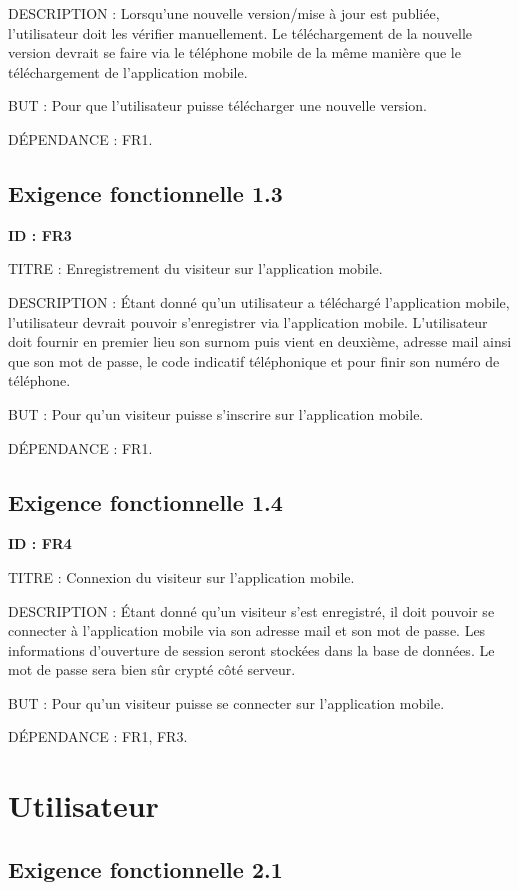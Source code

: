 \documentclass[titlepage, 12pt]{report}
\begin{document}
DESCRIPTION : Lorsqu'une nouvelle version/mise à jour est publiée, l'utilisateur doit les vérifier manuellement. Le téléchargement de la nouvelle version devrait se faire via le téléphone mobile de la même manière que le téléchargement de l'application mobile.

BUT : Pour que l'utilisateur puisse télécharger une nouvelle version.

DÉPENDANCE : FR1.

\subsection{Exigence fonctionnelle 1.3}

\textbf{ID : FR3}

TITRE : Enregistrement du visiteur sur l'application mobile.

DESCRIPTION : Étant donné qu'un utilisateur a téléchargé l'application mobile, l'utilisateur devrait pouvoir s'enregistrer via l'application mobile. L'utilisateur doit fournir en premier lieu son surnom puis vient en deuxième, adresse mail ainsi que son mot de passe, le code indicatif téléphonique et pour finir son numéro de téléphone.

BUT : Pour qu'un visiteur puisse s'inscrire sur l'application mobile.

DÉPENDANCE : FR1.

\subsection{Exigence fonctionnelle 1.4}

\textbf{ID : FR4}

TITRE : Connexion du visiteur sur l'application mobile.

DESCRIPTION : Étant donné qu'un visiteur s'est enregistré, il doit pouvoir se connecter à l'application mobile via son adresse mail et son mot de passe. Les informations d'ouverture de session seront stockées dans la base de données. Le mot de passe sera bien sûr crypté côté serveur.

BUT : Pour qu'un visiteur puisse se connecter sur l'application mobile.

DÉPENDANCE : FR1, FR3.

\section{Utilisateur}

\subsection{Exigence fonctionnelle 2.1}
\end{document}
